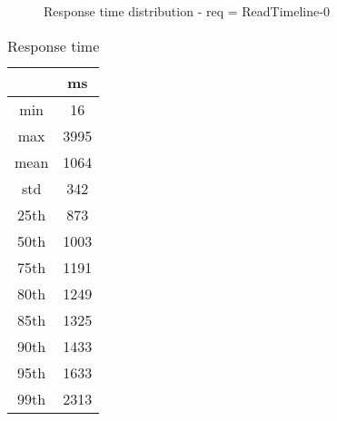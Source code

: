 \begin{minipage}{0.75\linewidth}
\begin{figure}[h]
\begin{adjustbox}{max width=1.0\linewidth, keepaspectratio}
  \end{adjustbox}
  \caption{Response time distribution - req = ReadTimeline-0}
\end{figure}
\end{minipage}\hfill\begin{minipage}{0.18\linewidth}
\begin{table}[h]
\begin{tabular}{|cc|}
\hline
\textbf{} & \textbf{ms}\\ \hline
 \Xhline{0.005\arrayrulewidth}
min & 16\\
 \Xhline{0.005\arrayrulewidth}
max & 3995\\
 \Xhline{0.005\arrayrulewidth}
mean & 1064\\
 \Xhline{0.005\arrayrulewidth}
std & 342\\
\hline
\hline
 \Xhline{0.005\arrayrulewidth}
25th & 873\\
 \Xhline{0.005\arrayrulewidth}
50th & 1003\\
 \Xhline{0.005\arrayrulewidth}
75th & 1191\\
 \Xhline{0.005\arrayrulewidth}
80th & 1249\\
 \Xhline{0.005\arrayrulewidth}
85th & 1325\\
 \Xhline{0.005\arrayrulewidth}
90th & 1433\\
 \Xhline{0.005\arrayrulewidth}
95th & 1633\\
 \Xhline{0.005\arrayrulewidth}
99th & 2313\\
\hline
\end{tabular}
\caption{Response time}
\end{table}
\end{minipage}\hfill